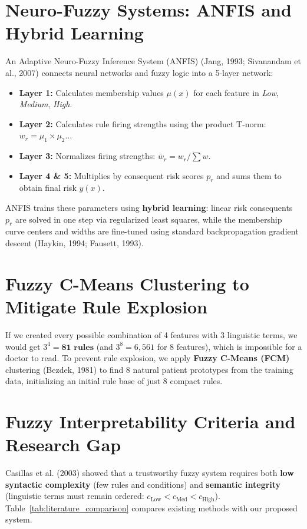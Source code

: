 \documentclass{report}
\begin{document}
\section{Neuro-Fuzzy Systems: ANFIS and Hybrid Learning}

An Adaptive Neuro-Fuzzy Inference System (ANFIS) (Jang, 1993; Sivanandam et al., 2007) connects neural networks and fuzzy logic into a 5-layer network:
\begin{itemize}
    \setlength{\itemsep}{0pt}
    \setlength{\parskip}{0pt}
    \item \textbf{Layer 1:} Calculates membership values $\mu(x)$ for each feature in \textit{Low}, \textit{Medium}, \textit{High}.
    \item \textbf{Layer 2:} Calculates rule firing strengths using the product T-norm: $w_r = \mu_1 \times \mu_2 \dots$
    \item \textbf{Layer 3:} Normalizes firing strengths: $\bar{w}_r = w_r / \sum w$.
    \item \textbf{Layer 4 \& 5:} Multiplies by consequent risk scores $p_r$ and sums them to obtain final risk $y(x)$.
\end{itemize}
ANFIS trains these parameters using \textbf{hybrid learning}: linear risk consequents $p_r$ are solved in one step via regularized least squares, while the membership curve centers and widths are fine-tuned using standard backpropagation gradient descent (Haykin, 1994; Fausett, 1993).

\section{Fuzzy C-Means Clustering to Mitigate Rule Explosion}

If we created every possible combination of 4 features with 3 linguistic terms, we would get $3^4 = \mathbf{81\text{ rules}}$ (and $3^8 = 6{,}561$ for 8 features), which is impossible for a doctor to read. To prevent rule explosion, we apply \textbf{Fuzzy C-Means (FCM)} clustering (Bezdek, 1981) to find 8 natural patient prototypes from the training data, initializing an initial rule base of just 8 compact rules.

\section{Fuzzy Interpretability Criteria and Research Gap}

Casillas et al. (2003) showed that a trustworthy fuzzy system requires both \textbf{low syntactic complexity} (few rules and conditions) and \textbf{semantic integrity} (linguistic terms must remain ordered: $c_{\text{Low}} < c_{\text{Med}} < c_{\text{High}}$). Table~\ref{tab:literature_comparison} compares existing methods with our proposed system.
\end{document}
